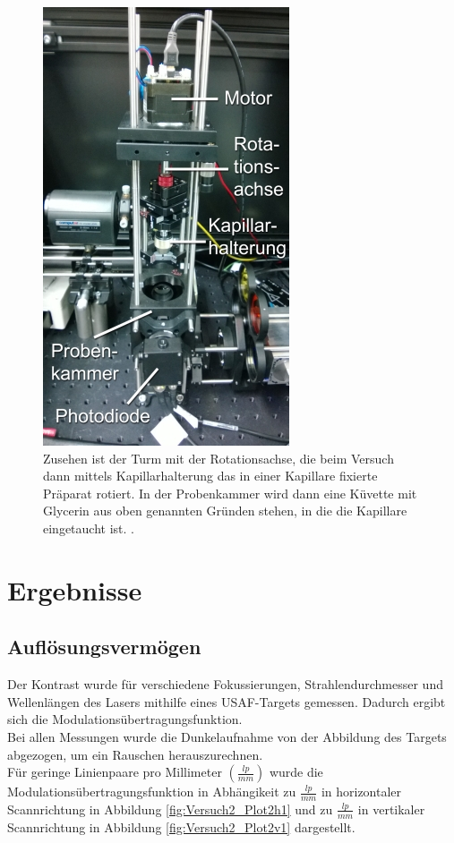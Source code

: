 \clearpage

\begin{figure}[H]
	\centering
\includegraphics[width=0.491\linewidth]{IMAGE/turm.png}
	\caption{Zusehen ist der Turm mit der Rotationsachse, die beim Versuch dann mittels Kapillarhalterung das in einer Kapillare fixierte Präparat rotiert.
In der Probenkammer wird dann eine Küvette mit Glycerin aus oben genannten Gründen stehen, in die die Kapillare eingetaucht ist. \cite{Anleitung}.
	}
	\label{fig:turm}
\end{figure}

\section{Ergebnisse}
\subsection{Auflösungsvermögen}
Der Kontrast wurde für verschiedene Fokussierungen, Strahlendurchmesser und Wellenlängen des Lasers mithilfe eines USAF-Targets gemessen. Dadurch ergibt sich die Modulationsübertragungsfunktion.\\ 
Bei allen Messungen wurde die Dunkelaufnahme von der Abbildung des Targets abgezogen, um ein Rauschen herauszurechnen.\\
	Für geringe Linienpaare pro Millimeter $\left( \frac{lp}{mm} \right)$ wurde die Modulationsübertragungsfunktion  in Abhängikeit zu $\frac{lp}{mm}$ in horizontaler Scannrichtung in Abbildung \ref{fig:Versuch2_Plot2h1} und zu $\frac{lp}{mm}$ in vertikaler Scannrichtung in Abbildung \ref{fig:Versuch2_Plot2v1} dargestellt.\\

